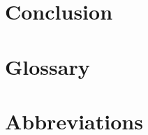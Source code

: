 \documentclass[final,1p,times,authoryear]{elsarticle}
\begin{document}
\section{Conclusion}

\section{Glossary}

\section{Abbreviations}






\end{document}
